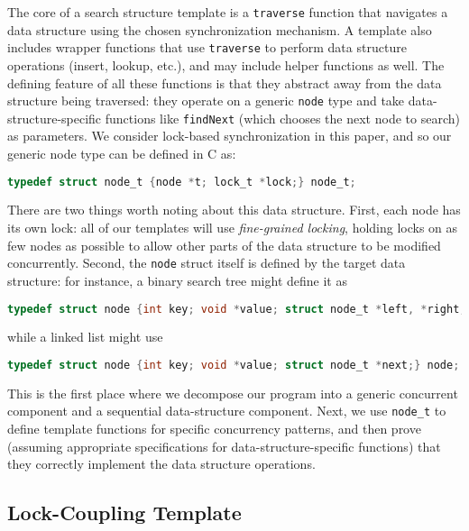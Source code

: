 \documentclass[a4paper,UKenglish,cleveref, autoref, thm-restate]{lipics-v2021}
\begin{document}
The core of a search structure template is a \lstinline{traverse} function that navigates a data structure using the chosen synchronization mechanism. A template also includes wrapper functions that use \lstinline{traverse} to perform data structure operations (insert, lookup, etc.), and may include helper functions as well. The defining feature of all these functions is that they abstract away from the data structure being traversed: they operate on a generic \lstinline{node} type and take data-structure-specific functions like \lstinline{findNext} (which chooses the next node to search) as parameters. We consider lock-based synchronization in this paper, and so our generic node type can be defined in C as:
\begin{lstlisting}[language = C, backgroundcolor=\color{white}, basicstyle=\ttfamily\footnotesize]
typedef struct node_t {node *t; lock_t *lock;} node_t;
\end{lstlisting}
There are two things worth noting about this data structure. First, each node has its own lock: all of our templates will use \emph{fine-grained locking}, holding locks on as few nodes as possible to allow other parts of the data structure to be modified concurrently. Second, the \lstinline{node} struct itself is defined by the target data structure: for instance, a binary search tree might define it as 
\begin{lstlisting}[language = C, backgroundcolor=\color{white}, basicstyle=\ttfamily\footnotesize]
typedef struct node {int key; void *value; struct node_t *left, *right;} node;
\end{lstlisting}
while a linked list might use
\begin{lstlisting}[language = C, backgroundcolor=\color{white}, basicstyle=\ttfamily\footnotesize]
typedef struct node {int key; void *value; struct node_t *next;} node;
\end{lstlisting}
This is the first place where we decompose our program into a generic concurrent component and a sequential data-structure component. Next, we use \lstinline{node_t} to define template functions for specific concurrency patterns, and then prove (assuming appropriate specifications for data-structure-specific functions) that they correctly implement the data structure operations.

\subsection{Lock-Coupling Template}
\label{lock-coupling-algo}
\end{document}
